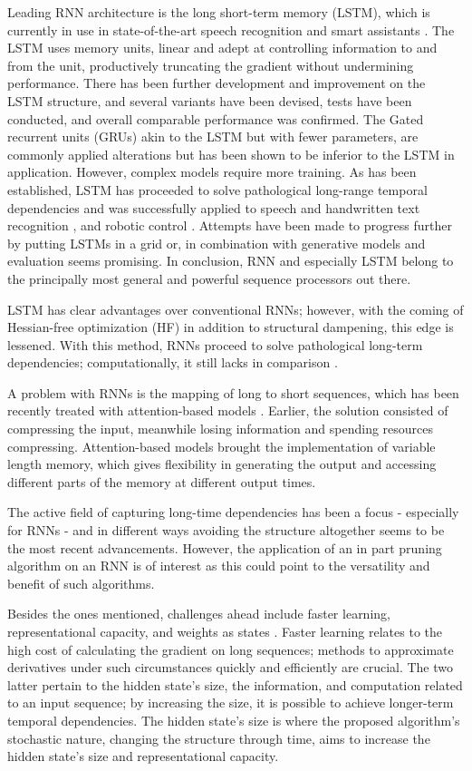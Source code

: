 Leading RNN architecture is the long short-term memory \cite{LSTM} (LSTM), which is currently in use in state-of-the-art speech recognition and smart assistants \cite{Apple}. The LSTM uses memory units, linear and adept at controlling information to and from the unit, productively truncating the gradient without undermining performance. There has been further development and improvement on the LSTM structure, and several variants have been devised, tests have been conducted, and overall comparable performance was confirmed\cite{Greff}. The Gated recurrent units (GRUs) akin to the LSTM but with fewer parameters, are commonly applied alterations but has been shown to be inferior to the LSTM in application. However, complex models require more training. As has been established, LSTM has proceeded to solve pathological long-range temporal dependencies and was successfully applied to speech and handwritten text recognition \cite{gs, gas}, and robotic control \cite{mayer}. Attempts have been made to progress further by putting LSTMs in a grid\cite{ka} or, in combination with generative models and evaluation seems promising\cite{gr, ch, bo}. In conclusion, RNN and especially LSTM belong to the principally most general and powerful sequence processors out there.

LSTM has clear advantages over conventional RNNs; however, with the coming of Hessian-free optimization (HF) in addition to structural dampening, this edge is lessened. With this method, RNNs proceed to solve pathological long-term dependencies; computationally, it still lacks in comparison \cite{suts}. 

A problem with RNNs is the mapping of long to short sequences, which has been recently treated with attention-based models \cite{xu}. Earlier, the solution consisted of compressing the input, meanwhile losing information and spending resources compressing. Attention-based models brought the implementation of variable length memory, which gives flexibility in generating the output and accessing different parts of the memory at different output times. 

The active field of capturing long-time dependencies has been a focus - especially for RNNs - and in different ways avoiding the structure altogether seems to be the most recent advancements. However, the application of an in part pruning algorithm on an RNN is of interest as this could point to the versatility and benefit of such algorithms.

Besides the ones mentioned, challenges ahead include faster learning, representational capacity, and weights as states \cite{suts}. Faster learning relates to the high cost of calculating the gradient on long sequences; methods to approximate derivatives under such circumstances quickly and efficiently are crucial. The two latter pertain to the hidden state's size, the information, and computation related to an input sequence; by increasing the size, it is possible to achieve longer-term temporal dependencies. The hidden state's size is where the proposed algorithm's stochastic nature, changing the structure through time, aims to increase the hidden state's size and representational capacity.

